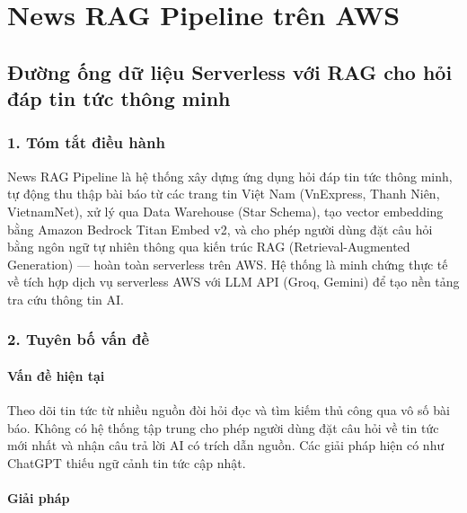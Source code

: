 \hypertarget{news-rag-pipeline-truxean-aws}{%
\section{News RAG Pipeline trên
AWS}}

\hypertarget{ux111ux1b0ux1eddng-ux1ed1ng-dux1eef-liux1ec7u-serverless-vux1edbi-rag-cho-hux1ecfi-ux111uxe1p-tin-tux1ee9c-thuxf4ng-minh}{%
\subsection{Đường ống dữ liệu Serverless với RAG cho hỏi đáp tin tức
thông
minh}}

\hypertarget{tuxf3m-tux1eaft-ux111iux1ec1u-huxe0nh}{%
\subsubsection{1. Tóm tắt điều
hành}}

News RAG Pipeline là hệ thống xây dựng ứng dụng hỏi đáp tin tức thông
minh, tự động thu thập bài báo từ các trang tin Việt Nam (VnExpress,
Thanh Niên, VietnamNet), xử lý qua Data Warehouse (Star Schema), tạo
vector embedding bằng Amazon Bedrock Titan Embed v2, và cho phép người
dùng đặt câu hỏi bằng ngôn ngữ tự nhiên thông qua kiến trúc RAG
(Retrieval-Augmented Generation) --- hoàn toàn serverless trên AWS. Hệ
thống là minh chứng thực tế về tích hợp dịch vụ serverless AWS với LLM
API (Groq, Gemini) để tạo nền tảng tra cứu thông tin AI.

\hypertarget{tuyuxean-bux1ed1-vux1ea5n-ux111ux1ec1}{%
\subsubsection{2. Tuyên bố vấn
đề}}

\hypertarget{vux1ea5n-ux111ux1ec1-hiux1ec7n-tux1ea1i}{%
\paragraph{Vấn đề hiện
tại}}

Theo dõi tin tức từ nhiều nguồn đòi hỏi đọc và tìm kiếm thủ công qua vô
số bài báo. Không có hệ thống tập trung cho phép người dùng đặt câu hỏi
về tin tức mới nhất và nhận câu trả lời AI có trích dẫn nguồn. Các giải
pháp hiện có như ChatGPT thiếu ngữ cảnh tin tức cập nhật.

\hypertarget{giux1ea3i-phuxe1p}{%
\paragraph{Giải pháp}}

